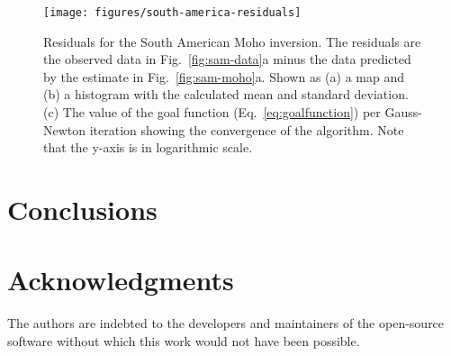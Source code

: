 \documentclass[extra]{gji}
\begin{document}
\begin{figure}
    \centering
    \texttt{[image: figures/south-america-residuals]}
    \caption{
        Residuals for the South American Moho inversion.
        The residuals are the observed data in Fig.~\ref{fig:sam-data}a
        minus the data predicted by the estimate in Fig.~\ref{fig:sam-moho}a.
        Shown as (a) a map and (b) a histogram with the calculated mean and
        standard deviation.
        (c) The value of the goal function (Eq.~\ref{eq:goalfunction})
        per Gauss-Newton iteration showing the convergence of the algorithm.
        Note that the y-axis is in logarithmic scale.
    }
    \label{fig:sam-residuals}
\end{figure}


\lipsum[1-7]



\section{Conclusions}

\lipsum[1-7]

\section{Acknowledgments}

The authors are indebted to the developers and maintainers of the open-source
software without which this work would not have been possible.



\end{document}
